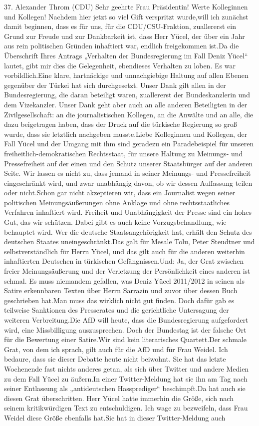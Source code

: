 \documentclass{article}
\begin{document}
	37. Alexander Throm (CDU) Sehr geehrte Frau Präsidentin! Werte Kolleginnen und Kollegen! Nachdem hier jetzt so viel Gift verspritzt wurde,will ich zunächst damit beginnen, dass es für uns, für die CDU/CSU-Fraktion, zuallererst ein Grund zur Freude und zur Dankbarkeit ist, dass Herr Yücel, der über ein Jahr aus rein politischen Gründen inhaftiert war, endlich freigekommen ist.Da die Überschrift Ihres Antrags „Verhalten der Bundesregierung im Fall Deniz Yücel“ lautet, gibt mir dies die Gelegenheit, ebendieses Verhalten zu loben. Es war vorbildlich.Eine klare, hartnäckige und unnachgiebige Haltung auf allen Ebenen gegenüber der Türkei hat sich durchgesetzt. Unser Dank gilt allen in der Bundesregierung, die daran beteiligt waren, zuallererst der Bundeskanzlerin und dem Vizekanzler. Unser Dank geht aber auch an alle anderen Beteiligten in der Zivilgesellschaft: an die journalistischen Kollegen, an die Anwälte und an alle, die dazu beigetragen haben, dass der Druck auf die türkische Regierung so groß wurde, dass sie letztlich nachgeben musste.Liebe Kolleginnen und Kollegen, der Fall Yücel und der Umgang mit ihm sind geradezu ein Paradebeispiel für unseren freiheitlich-demokratischen Rechtsstaat, für unsere Haltung zu Meinungs- und Pressefreiheit auf der einen und den Schutz unserer Staatsbürger auf der anderen Seite. Wir lassen es nicht zu, dass jemand in seiner Meinungs- und Pressefreiheit eingeschränkt wird, und zwar unabhängig davon, ob wir dessen Auffassung teilen oder nicht.Schon gar nicht akzeptieren wir, dass ein Journalist wegen seiner politischen Meinungsäußerungen ohne Anklage und ohne rechtsstaatliches Verfahren inhaftiert wird. Freiheit und Unabhängigkeit der Presse sind ein hohes Gut, das wir schützen. Dabei gibt es auch keine Vorzugsbehandlung, wie behauptet wird. Wer die deutsche Staatsangehörigkeit hat, erhält den Schutz des deutschen Staates uneingeschränkt.Das galt für Mesale Tolu, Peter Steudtner und selbstverständlich für Herrn Yücel, und das gilt auch für die anderen weiterhin inhaftierten Deutschen in türkischen Gefängnissen.Und: Ja, der Grat zwischen freier Meinungsäußerung und der Verletzung der Persönlichkeit eines anderen ist schmal. Es muss niemandem gefallen, was Deniz Yücel 2011/2012 in seinen als Satire erkennbaren Texten über Herrn Sarrazin und zuvor über dessen Buch geschrieben hat.Man muss das wirklich nicht gut finden. Doch dafür gab es teilweise Sanktionen des Presserates und die gerichtliche Untersagung der weiteren Verbreitung.Die AfD will heute, dass die Bundesregierung aufgefordert wird, eine Missbilligung auszusprechen. Doch der Bundestag ist der falsche Ort für die Bewertung einer Satire.Wir sind kein literarisches Quartett.Der schmale Grat, von dem ich sprach, gilt auch für die AfD und für Frau Weidel. Ich bedaure, dass sie dieser Debatte heute nicht beiwohnt. Sie hat das letzte Wochenende fast nichts anderes getan, als sich über Twitter und andere Medien zu dem Fall Yücel zu äußern.In einer Twitter-Meldung hat sie ihn am Tag nach seiner Entlassung als „antideutschen Hassprediger“ beschimpft.Da hat auch sie diesen Grat überschritten. Herr Yücel hatte immerhin die Größe, sich nach seinem kritikwürdigen Text zu entschuldigen. Ich wage zu bezweifeln, dass Frau Weidel diese Größe ebenfalls hat.Sie hat in dieser Twitter-Meldung auch 
\end{document}
